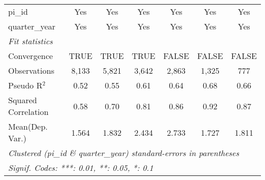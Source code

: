 \begin{tabular}{lcccccc}
   pi\_id                                                     & Yes           & Yes           & Yes           & Yes           & Yes           & Yes\\  
   quarter\_year                                              & Yes           & Yes           & Yes           & Yes           & Yes           & Yes\\  
   \midrule
   \emph{Fit statistics}\\
   Convergence                                                &TRUE           & TRUE          & TRUE          & FALSE         & FALSE         & FALSE\\  
   Observations                                               & 8,133         & 5,821         & 3,642         & 2,863         & 1,325         & 777\\  
   Pseudo R$^2$                                               & 0.52          & 0.55          & 0.61          & 0.64          & 0.68          & 0.66\\  
   Squared Correlation                                        & 0.58          & 0.70          & 0.81          & 0.86          & 0.92          & 0.87\\  
Mean(Dep. Var.) & 1.564 & 1.832 & 2.434 & 2.733 & 1.727 & 1.811 \\
   \midrule \midrule
   \multicolumn{7}{l}{\emph{Clustered (pi\_id \& quarter\_year) standard-errors in parentheses}}\\
   \multicolumn{7}{l}{\emph{Signif. Codes: ***: 0.01, **: 0.05, *: 0.1}}\\
\end{tabular}
\par\endgroup
